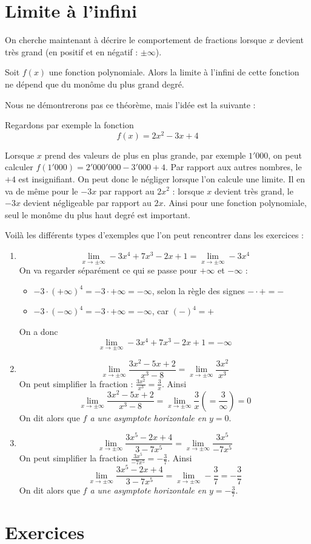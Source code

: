 \section{Limite à l'infini}

On cherche maintenant à décrire le comportement de fractions lorsque $x$ devient très grand (en positif et en négatif : $\pm \infty$). 

\begin{theoreme}
Soit $f(x)$ une fonction polynomiale. Alors la limite à l'infini de cette fonction ne dépend que du monôme du plus grand degré.
\end{theoreme}

Nous ne démontrerons pas ce théorème, mais l'idée est la suivante :

Regardons par exemple la fonction $$f(x) = 2x^2 -3x+4$$

Lorsque $x$ prend des valeurs de plus en plus grande, par exemple $1'000$, on peut calculer $f(1'000) = 2'000'000 - 3'000 + 4$. Par rapport aux autres nombres, le $+4$ est insignifiant. On peut donc le négliger lorsque l'on calcule une limite. Il en va de même pour le $-3x$ par rapport au $2x^2$ : lorsque $x$ devient très grand, le $-3x$ devient négligeable par rapport au $2x$. Ainsi pour une fonction polynomiale, seul le monôme du plus haut degré est important.

\begin{exemple}
Voilà les différents types d'exemples que l'on peut rencontrer dans les exercices :
\begin{enumerate}
\item $$ \lim_{x\rightarrow \pm \infty} -3x^4+7x^3-2x+1 = \lim_{x\rightarrow \pm \infty} -3x^4$$
On va regarder séparément ce qui se passe pour $+\infty$ et $-\infty$ :
	\begin{itemize}
	\item $-3\cdot (+\infty)^4 = -3 \cdot +\infty = -\infty$, selon la règle des signes $-\cdot + = -$
	\item $-3\cdot (-\infty)^4 = -3 \cdot +\infty = -\infty$, car $(-)^4 = +$
	\end{itemize}
On a donc 
$$
\lim_{x\rightarrow \pm \infty} -3x^4+7x^3-2x+1 = -\infty
$$
\item 
$$
\lim_{x\rightarrow \pm \infty} \frac{3x^2-5x+2}{x^3-8} = \lim_{x\rightarrow \pm \infty} \frac{3x^2}{x^3}
$$
On peut simplifier la fraction : $\frac{3x^2}{x^3} = \frac{3}{x}$. Ainsi 
$$
\lim_{x\rightarrow \pm \infty} \frac{3x^2-5x+2}{x^3-8} = \lim_{x\rightarrow \pm \infty} \frac{3}{x} \left( = \frac{3}{\infty} \right) = 0
$$
On dit alors que \emph{$f$ a une asymptote horizontale en $y=0$}.
\item 
$$
\lim_{x\rightarrow \pm \infty} \frac{3x^5-2x+4}{3-7x^5} = \lim_{x\rightarrow \pm \infty} \frac{3x^5}{-7x^5}
$$
On peut simplifier la fraction $\frac{3x^5}{-7x^5} = -\frac{3}{7}$. Ainsi
$$
\lim_{x\rightarrow \pm \infty} \frac{3x^5-2x+4}{3-7x^5} = \lim_{x\rightarrow \pm \infty} -\frac{3}{7} = -\frac{3}{7}
$$
On dit alors que \emph{$f$ a une asymptote horizontale en $y=-\frac{3}{7}$}.
\end{enumerate}
\end{exemple}

\section{Exercices}

